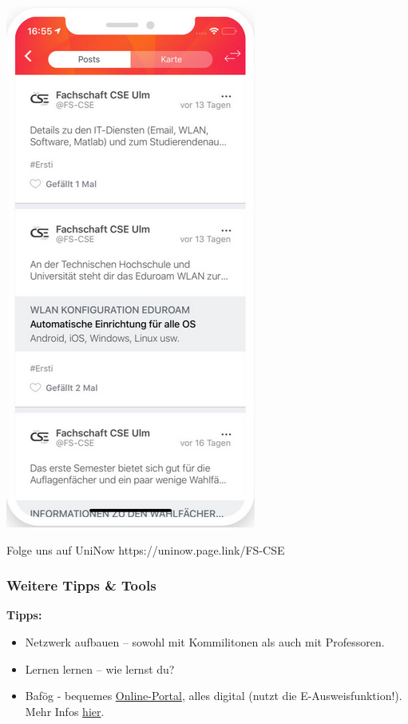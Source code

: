 \documentclass[10pt,a4paper]{beamer}
\begin{document}
\begin{frame}
\begin{center}
            \includegraphics[height=0.7\textheight]{uninow2.png}
        \end{center}
        \begin{block}{Folge uns auf UniNow}
            https://uninow.page.link/FS-CSE
        \end{block}
    \end{frame}

    \begin{frame}
        \frametitle{Weitere Tipps \& Tools}
        \vfill
        \textbf{Tipps:}
        \vfill
        \begin{itemize}
            \item Netzwerk aufbauen – sowohl mit Kommilitonen als auch mit Professoren.
            \vfill
            \item Lernen lernen – wie lernst du?
            \vfill
            \item Bafög - bequemes \href{https://www.bafoeg-digital.de/}{\color{ecs100}Online-Portal}, alles digital (nutzt die E-Ausweisfunktion!). Mehr Infos \href{https://studierendenwerk-ulm.de/bafoeg-finanzen/}{\color{ecs100}hier}.
        \end{itemize}
        \vfill
    \end{frame}
\end{document}
